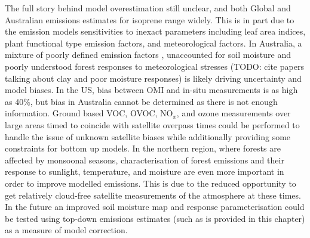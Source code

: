   The full story behind model overestimation still unclear, and both Global and Australian emissions estimates for isoprene range widely.
  This is in part due to the emission models sensitivities to inexact parameters including leaf area indices, plant functional type emission factors, and meteorological factors. 
  In Australia, a mixture of poorly defined emission factors \parencite[e.g.][]{Emmerson2016}, unaccounted for soil moisture \parencite[e.g.][]{Sindelarova2014} and poorly understood forest responses to meteorological stresses (TODO: cite papers talking about clay and poor moisture responses) is likely driving uncertainty and model biases.
  In the US, bias between OMI and in-situ measurements is as high as 40\%, but bias in Australia cannot be determined as there is not enough information.
  Ground based VOC, OVOC, NO$_x$, and ozone measurements over large areas timed to coincide with satellite overpass times could be performed to handle the issue of unknown satellite biases while additionally providing some constraints for bottom up models.
  In the northern region, where forests are affected by monsoonal seasons, characterisation of forest emissions and their response to sunlight, temperature, and moisture are even more important in order to improve modelled emissions.
  This is due to the reduced opportunity to get relatively cloud-free satellite measurements of the atmosphere at these times.
  In the future an improved soil moisture map and response parameterisation could be tested using top-down emissions estimates (such as is provided in this chapter) as a measure of model correction.
  

%  
  